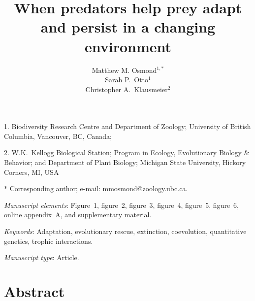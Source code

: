 \documentclass[11pt]{article}
\title{When predators help prey adapt and persist in a changing environment}
\author{Matthew M. Osmond$^{1,\ast}$ \\
Sarah P.\ Otto$^{1}$ \\
Christopher A.\ Klausmeier$^{2}$}
\date{}
\begin{document}
\maketitle

\noindent{}1. Biodiversity Research Centre and Department of Zoology; University of British Columbia, Vancouver, BC, Canada;

\noindent{}2. W.K.\ Kellogg Biological Station; Program in Ecology, Evolutionary Biology \& Behavior; and Department of Plant Biology; Michigan State University, Hickory Corners, MI, USA

\noindent{}$\ast$ Corresponding author; e-mail: mmosmond@zoology.ubc.ca.

\bigskip

\textit{Manuscript elements}: Figure~1, figure~2, figure~3, figure~4, figure~5, figure~6,
online appendix~A, and supplementary material.

\bigskip

\textit{Keywords}: Adaptation, evolutionary rescue, extinction, coevolution, quantitative genetics, trophic interactions.

\bigskip

\textit{Manuscript type}: Article. 

\bigskip


\linenumbers{}
\modulolinenumbers[3]

\newpage{}

\section*{Abstract}
\end{document}
